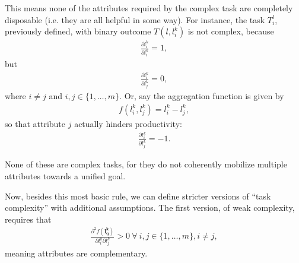 {\begin{definition}
        This means none of the attributes required by the complex task are completely disposable (i.e. they are all helpful in some way). For instance, the task $T_{i}^{l}$, previously defined, with binary outcome $T(l, l_{i}^{k})$ is not complex, because
        \begin{gather}
            \frac{
                \partial
                l_{i}^{k}
            }{
                \partial 
                l_{i}^{k}
            } = 1
            ,
        \end{gather}
        but
        \begin{gather}
            \frac{
                \partial
                l_{i}^{k}
            }{
                \partial 
                l_{j}^{k}
            } = 0
            , 
        \end{gather}
        where $i \neq j$ and $i, j \in \{1, \dots, m\}$. Or, say the aggregation function is given by
        \begin{gather}
            f(l_{i}^{k}, l_{j}^{k}) = 
            l_{i}^{k} - l_{j}^{k}
            ,
        \end{gather}
        so that attribute $j$ actually hinders productivity:
        \begin{gather}
            \frac{
                \partial
                l_{i}^{k}
            }{
                \partial 
                l_{j}^{k}
            } = -1
            .
        \end{gather}
            
        None of these are complex tasks, for they do not coherently mobilize multiple attributes towards a unified goal.
        
        \begin{subdefinition}
            Now, besides this most basic rule, we can define stricter versions of ``task complexity'' with additional assumptions. The first version, of weak complexity, requires that
            \begin{gather}
                \frac{
                    \partial ^ 2 {f(\boldsymbol{l_{q}^{k}})}
                }{
                    \partial 
                    l_{i}^{k}
                    \partial
                    l_{j}^{k}
                }
                > 0
                \
                \forall
                \
                i, j \in \{1, \dots, m\}
                ,
                i \neq j
                ,
            \end{gather}
            meaning attributes are complementary.
        \end{subdefinition}
        

\end{definition}}
